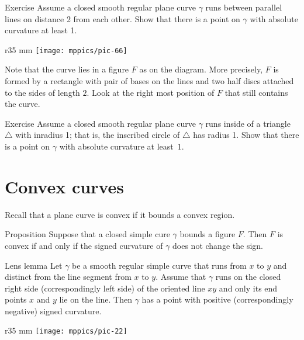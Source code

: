 \begin{thm}{Exercise}\label{ex:between-parallels}
Assume a closed smooth regular plane curve $\gamma$ runs between parallel lines on distance 2 from each other.
Show that there is a point on $\gamma$ with absolute curvature at least 1.
\end{thm}

\begin{wrapfigure}{r}{35 mm}
\vskip1mm
\centering
\texttt{[image: mppics/pic-66]}
\vskip0mm
\end{wrapfigure}

 Note that the curve lies in a figure $F$ as on the diagram.
More precisely, $F$ is formed by a rectangle with pair of bases on the lines and two half discs attached to the sides of length $2$.
Look at the right most position of $F$ that still contains the curve.

\begin{thm}{Exercise}\label{ex:in-triangle}
Assume a closed smooth regular plane curve $\gamma$ runs inside of a triangle $\triangle$ with inradius 1; that is, the inscribed circle of $\triangle$ has radius 1.
Show that there is a point on $\gamma$ with absolute curvature at least~$1$.
\end{thm}



\section*{Convex curves}

Recall that a plane curve is convex if it bounds a convex region.

\begin{thm}{Proposition}\label{prop:convex}
Suppose that a closed simple cure $\gamma$ bounds a figure $F$.
Then $F$ is convex if and only if the signed curvature of $\gamma$ does not change the sign.
\end{thm}


\begin{thm}{Lens lemma}\label{lem:lens}
Let $\gamma$ be a smooth regular simple curve that runs from $x$ to $y$ and distinct from the line segment from $x$ to $y$.
Assume that $\gamma$ runs on the closed right side (correspondingly left side) of the oriented line $xy$ and only its end points $x$ and $y$ lie on the line.
Then $\gamma$ has a point with positive  (correspondingly negative) signed curvature.
\end{thm}

\begin{wrapfigure}{r}{35 mm}
\vskip-4mm
\centering
\texttt{[image: mppics/pic-22]}
\vskip0mm
\end{wrapfigure}

